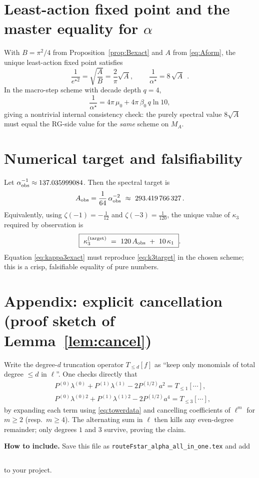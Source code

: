 \documentclass[11pt]{article}
\theoremstyle{definition}
\theoremstyle{remark}
\begin{document}
\section{Least-action fixed point and the master equality for \texorpdfstring{$\alpha$}{alpha}}
With $B=\pi^2/4$ from Proposition~\ref{prop:Bexact} and $A$ from \eqref{eq:Aform}, the unique least-action fixed point satisfies
\begin{equation}\label{eq:alphaFP}
\frac{1}{e^{\star 2}}=\sqrt{\frac{A}{B}}=\frac{2}{\pi}\sqrt{A},\qquad \boxed{\ \frac{1}{\alpha^\star}=8\,\sqrt{A}\ }\ .
\end{equation}
In the macro-step scheme with decade depth $q=4$,
\begin{equation}\label{eq:RGmatch}
\frac{1}{\alpha^\star}=4\pi\,\mu_0+4\pi\,\beta_0\,q\ln 10,
\end{equation}
giving a nontrivial internal consistency check: the purely spectral value $8\sqrt{A}$ must equal the RG-side value for the \emph{same} scheme on $M_A$.

\section{Numerical target and falsifiability}
Let $\alpha_{\rm obs}^{-1}\approx 137.035999084$. Then the spectral target is
\begin{equation}\label{eq:Aobs}
A_{\rm obs}=\frac{1}{64}\,\alpha_{\rm obs}^{-2}\ \approx\ \num{293.419766327}\,.
\end{equation}
Equivalently, using $\zeta(-1)=-\tfrac{1}{12}$ and $\zeta(-3)=\tfrac{1}{120}$, the unique value of $\kappa_3$ required by observation is
\begin{equation}\label{eq:k3target}
\boxed{\ \kappa_3^{\rm (target)}\ =\ 120\,A_{\rm obs}\ +\ 10\,\kappa_1\ }.
\end{equation}
Equation \eqref{eq:kappa3exact} must reproduce \eqref{eq:k3target} in the chosen scheme; this is a crisp, falsifiable equality of pure numbers.

\section*{Appendix: explicit cancellation (proof sketch of Lemma~\ref{lem:cancel})}
Write the degree-$d$ truncation operator $T_{\le d}[f]$ as ``keep only monomials of total degree $\le d$ in $\ell$''. One checks directly that
\begin{align*}
&P^{(0)}\lambda^{(0)}+P^{(1)}\lambda^{(1)}-2P^{(1/2)}a^{2}=T_{\le 1}[\cdots],\\
&P^{(0)}\lambda^{(0)2}+P^{(1)}\lambda^{(1)2}-2P^{(1/2)}a^{4}=T_{\le 3}[\cdots],
\end{align*}
by expanding each term using \eqref{eq:towerdata} and cancelling coefficients of $\ell^m$ for $m\ge 2$ (resp.\ $m\ge 4$). The alternating sum in $\ell$ then kills any even-degree remainder; only degrees $1$ and $3$ survive, proving the claim.

\medskip
\noindent\textbf{How to include.} Save this file as \texttt{routeFstar\_alpha\_all\_in\_one.tex} and add
\begin{verbatim}

\end{verbatim}
to your project.
\end{document}
